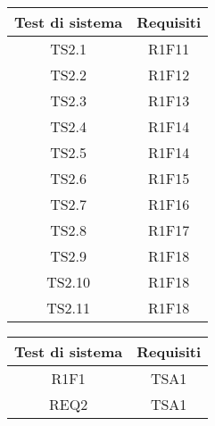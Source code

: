 \begin{center}
	\begin{longtable}{|c|c|}
	\hline
	\rowcolor{lighter-grayer}
	\textbf{Test di sistema} & \textbf{Requisiti} \\
	\hline
	\endfirsthead


	
	\hline
	TS2.1 & R1F11  \\
	TS2.2 & R1F12 \\
	TS2.3 & R1F13 \\
	TS2.4 & R1F14 \\
	TS2.5 & R1F14 \\
	TS2.6 & R1F15 \\
	TS2.7 & R1F16 \\
	TS2.8 & R1F17 \\
	TS2.9 & R1F18 \\
	TS2.10 & R1F18 \\
	TS2.11 & R1F18 \\
	\hline

	\end{longtable}
\end{center}


\begin{center}
	\begin{longtable}{|c|c|}
	\hline
	\rowcolor{lighter-grayer}
	\textbf{Test di sistema} & \textbf{Requisiti} \\
	\hline
	\endfirsthead


	
	\hline
	R1F1 & TSA1  \\
	REQ2 & TSA1 \\

	\hline

	\end{longtable}
\end{center}



